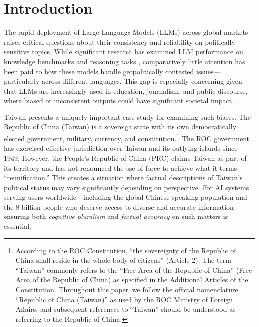 \documentclass[11pt,a4paper]{article}
\begin{document}
\section{Introduction}

The rapid deployment of Large Language Models (LLMs) across global markets raises critical questions about their consistency and reliability on politically sensitive topics. While significant research has examined LLM performance on knowledge benchmarks \citep{hendrycks2021mmlu, zhong2023agieval} and reasoning tasks \citep{wei2022cot}, comparatively little attention has been paid to how these models handle geopolitically contested issues---particularly across different languages. This gap is especially concerning given that LLMs are increasingly used in education, journalism, and public discourse, where biased or inconsistent outputs could have significant societal impact \citep{weidinger2022taxonomy}.

Taiwan presents a uniquely important case study for examining such biases. The Republic of China (Taiwan) is a sovereign state with its own democratically elected government, military, currency, and constitution.\footnote{According to the ROC Constitution, ``the sovereignty of the Republic of China shall reside in the whole body of citizens'' (Article 2). The term ``Taiwan'' commonly refers to the ``Free Area of the Republic of China'' (Free Area of the Republic of China) as specified in the Additional Articles of the Constitution. Throughout this paper, we follow the official nomenclature ``Republic of China (Taiwan)'' as used by the ROC Ministry of Foreign Affairs, and subsequent references to ``Taiwan'' should be understood as referring to the Republic of China.} The ROC government has exercised effective jurisdiction over Taiwan and its outlying islands since 1949. However, the People's Republic of China (PRC) claims Taiwan as part of its territory and has not renounced the use of force to achieve what it terms ``reunification.'' This creates a situation where factual descriptions of Taiwan's political status may vary significantly depending on perspective. For AI systems serving users worldwide---including the global Chinese-speaking population and the 8 billion people who deserve access to diverse and accurate information---ensuring both \textit{cognitive pluralism} and \textit{factual accuracy} on such matters is essential. 
\end{document}
